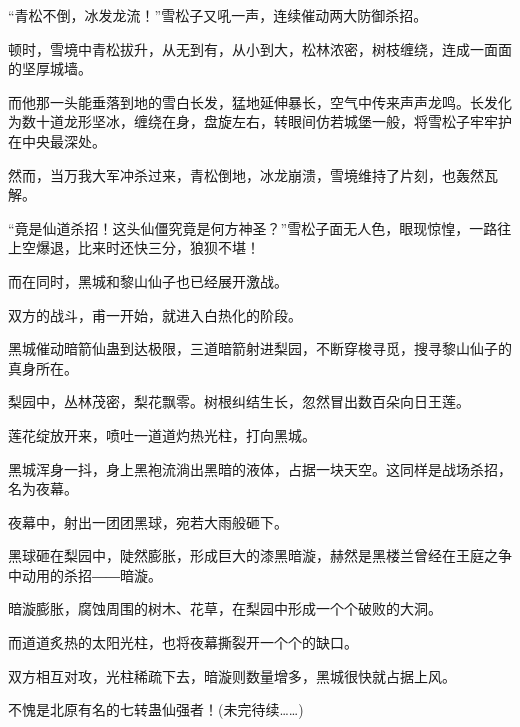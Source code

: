 \begin{this_body}
“青松不倒，冰发龙流！”雪松子又吼一声，连续催动两大防御杀招。

顿时，雪境中青松拔升，从无到有，从小到大，松林浓密，树枝缠绕，连成一面面的坚厚城墙。

而他那一头能垂落到地的雪白长发，猛地延伸暴长，空气中传来声声龙鸣。长发化为数十道龙形坚冰，缠绕在身，盘旋左右，转眼间仿若城堡一般，将雪松子牢牢护在中央最深处。

然而，当万我大军冲杀过来，青松倒地，冰龙崩溃，雪境维持了片刻，也轰然瓦解。

“竟是仙道杀招！这头仙僵究竟是何方神圣？”雪松子面无人色，眼现惊惶，一路往上空爆退，比来时还快三分，狼狈不堪！

而在同时，黑城和黎山仙子也已经展开激战。

双方的战斗，甫一开始，就进入白热化的阶段。

黑城催动暗箭仙蛊到达极限，三道暗箭射进梨园，不断穿梭寻觅，搜寻黎山仙子的真身所在。

梨园中，丛林茂密，梨花飘零。树根纠结生长，忽然冒出数百朵向日王莲。

莲花绽放开来，喷吐一道道灼热光柱，打向黑城。

黑城浑身一抖，身上黑袍流淌出黑暗的液体，占据一块天空。这同样是战场杀招，名为夜幕。

夜幕中，射出一团团黑球，宛若大雨般砸下。

黑球砸在梨园中，陡然膨胀，形成巨大的漆黑暗漩，赫然是黑楼兰曾经在王庭之争中动用的杀招――暗漩。

暗漩膨胀，腐蚀周围的树木、花草，在梨园中形成一个个破败的大洞。

而道道炙热的太阳光柱，也将夜幕撕裂开一个个的缺口。

双方相互对攻，光柱稀疏下去，暗漩则数量增多，黑城很快就占据上风。

不愧是北原有名的七转蛊仙强者！(未完待续……)

\end{this_body}

